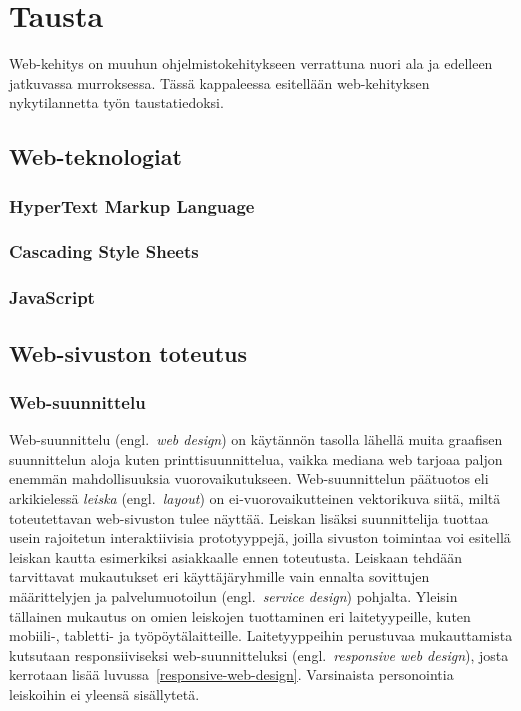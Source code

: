\documentclass[finnish, 12pt, a4paper, elec, utf8, a-1b, online]{aaltothesis}
\begin{document}
\clearpage

\section{Tausta}

Web-kehitys on muuhun ohjelmistokehitykseen verrattuna nuori ala ja
edelleen jatkuvassa murroksessa. Tässä kappaleessa esitellään web-kehityksen
nykytilannetta työn taustatiedoksi.

\subsection{Web-teknologiat}

\subsubsection{HyperText Markup Language}

\subsubsection{Cascading Style Sheets}

\subsubsection{JavaScript}

\subsection{Web-sivuston toteutus}

\subsubsection{Web-suunnittelu}

Web-suunnittelu (engl.~\textit{web design}) on käytännön tasolla lähellä muita
graafisen suunnittelun aloja kuten printtisuunnittelua, vaikka mediana web
tarjoaa paljon enemmän mahdollisuuksia vuorovaikutukseen. Web-suunnittelun
päätuotos eli arkikielessä \textit{leiska} (engl.~\textit{layout}) on
ei-vuorovaikutteinen vektorikuva siitä, miltä toteutettavan web-sivuston tulee
näyttää. Leiskan lisäksi suunnittelija tuottaa usein rajoitetun interaktiivisia
prototyyppejä, joilla sivuston toimintaa voi esitellä leiskan kautta esimerkiksi
asiakkaalle ennen toteutusta. Leiskaan tehdään tarvittavat mukautukset eri
käyttäjäryhmille vain ennalta sovittujen määrittelyjen ja palvelumuotoilun
(engl.~\textit{service design}) pohjalta. Yleisin tällainen mukautus on omien
leiskojen tuottaminen eri laitetyypeille, kuten mobiili-, tabletti- ja
työpöytälaitteille. Laitetyyppeihin perustuvaa mukauttamista kutsutaan
responsiiviseksi web-suunnitteluksi (engl.~\textit{responsive web design}),
josta kerrotaan lisää luvussa~\ref{responsive-web-design}. Varsinaista
personointia leiskoihin ei yleensä sisällytetä.
\end{document}

